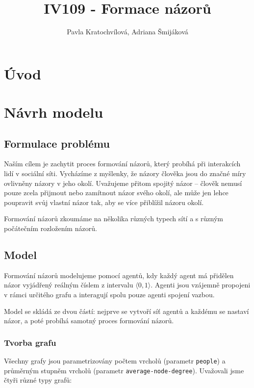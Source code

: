 \documentclass[10pt,a4paper]{report}
\author{Pavla Kratochvílová, Adriana Šmijáková}
\title{IV109 - Formace názorů}
\begin{document}
\maketitle
\chapter{Úvod}

\chapter{Návrh modelu}
\section{Formulace problému}
Naším cílem je zachytit proces formování názorů, který probíhá při interakcích lidí v sociální síti. Vycházíme z myšlenky, že názory člověka jsou do značné míry ovlivněny názory v jeho okolí. Uvažujeme přitom spojitý názor -- člověk nemusí pouze zcela přijmout nebo zamítnout názor svého okolí, ale může jen lehce poupravit svůj vlastní názor tak, aby se více přiblížil názoru okolí. 

Formování názorů zkoumáme na několika různých typech sítí a s různým počátečním rozložením názorů. 

\section{Model}
Formování názorů modelujeme pomocí agentů, kdy každý agent má přidělen názor vyjádřený reálným číslem z intervalu $\langle 0, 1 \rangle$. Agenti jsou vzájemně propojeni v rámci určitého grafu a interagují spolu pouze agenti spojení vazbou.

Model se skládá ze dvou částí: nejprve se vytvoří síť agentů a každému se nastaví názor, a poté probíhá samotný proces formování názorů.

\subsection{Tvorba grafu}
Všechny grafy jsou parametrizovány počtem vrcholů (parametr \texttt{people}) a prů\-měr\-ným stupněm vrcholů (parametr \texttt{average-node-degree}). Uvažovali jsme čtyři různé typy grafů:
\end{document}
